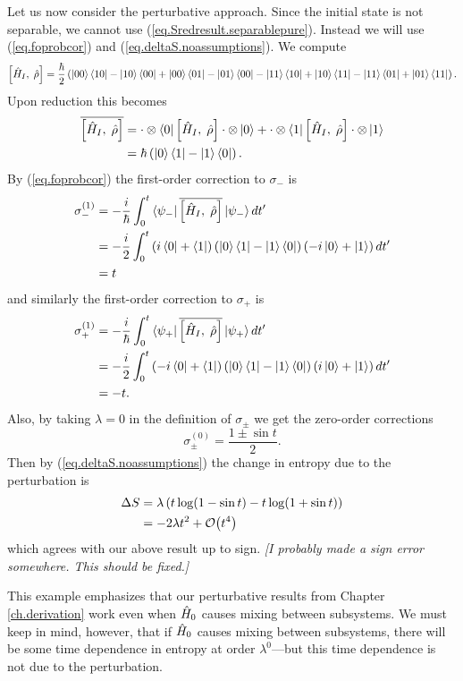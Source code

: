Let us now consider the perturbative approach. Since the initial state is not separable, we cannot use (\ref{eq.Sredresult.separablepure}). Instead we will use (\ref{eq.foprobcor}) and (\ref{eq.deltaS.noassumptions}). We compute
\[
\left[\hat{H}_I, \;\hat{\rho}\right] = \frac{\hbar}{2} \left(\left|00\right\rangle\left\langle10\right|- \left|10\right\rangle\left\langle00\right| + \left|00\right\rangle\left\langle01\right| - \left|01\right\rangle\left\langle00\right| - \left|11\right\rangle\left\langle10\right| + \left|10\right\rangle\left\langle11\right| - \left|11\right\rangle\left\langle01\right| +\left|01\right\rangle\left\langle11\right|\right).
\]
Upon reduction this becomes
\begin{align*}
\overline{\left[\hat{H}_I, \;\hat{\rho}\right]} &= \cdot\otimes\left\langle0\right| \left[\hat{H}_I, \;\hat{\rho}\right] \cdot\otimes\left|0\right\rangle + \cdot\otimes\left\langle1\right| \left[\hat{H}_I, \;\hat{\rho}\right] \cdot\otimes\left|1\right\rangle \\
&= \hbar\left(\left|0\right\rangle\left\langle1\right| - \left|1\right\rangle\left\langle0\right|\right).
\end{align*}
By (\ref{eq.foprobcor}) the first-order correction to \(\sigma_-\) is
\begin{align*}
\sigma_-^{(1)} &= -\frac{i}{\hbar} \int_{0}^t \left\langle\psi_-\right| \overline{\left[\hat{H}_I, \;\hat{\rho}\right]} \left|\psi_-\right\rangle dt^\prime \\
&= -\frac{i}{2} \int_{0}^t \left(i\left\langle0\right| + \left\langle1\right|\right) \left(\left|0\right\rangle\left\langle1\right| - \left|1\right\rangle\left\langle0\right|\right) \left(-i\left|0\right\rangle + \left|1\right\rangle\right) dt^\prime \\
&= t
\end{align*}
and similarly the first-order correction to \(\sigma_+\) is
\begin{align*}
\sigma_+^{(1)} &= -\frac{i}{\hbar} \int_{0}^t \left\langle\psi_+\right| \overline{\left[\hat{H}_I, \;\hat{\rho}\right]} \left|\psi_+\right\rangle dt^\prime \\
&= -\frac{i}{2} \int_{0}^t \left(-i\left\langle0\right| + \left\langle1\right|\right) \left(\left|0\right\rangle\left\langle1\right| - \left|1\right\rangle\left\langle0\right|\right) \left(i\left|0\right\rangle + \left|1\right\rangle\right) dt^\prime \\
&= -t.
\end{align*}
Also, by taking \(\lambda=0\) in the definition of \(\sigma_\pm\) we get the zero-order corrections
\[
\sigma_\pm^{(0)} = \frac{1\pm \sin t}{2}.
\]
Then by (\ref{eq.deltaS.noassumptions}) the change in entropy due to the perturbation is
\begin{align*}
\Delta S &= \lambda \left(t \log (1 - \sin t) - t\log(1+\sin t)\right) \\
&= -2\lambda t^2 + \mathcal{O}{\left(t^4\right)}
\end{align*}
which agrees with our above result up to sign. \emph{[I probably made a sign error somewhere. This should be fixed.]}

This example emphasizes that our perturbative results from Chapter \ref{ch.derivation} work even when \(\hat{H}_0\) causes mixing between subsystems. We must keep in mind, however, that if \(\hat{H}_0\) causes mixing between subsystems, there will be some time dependence in entropy at order \(\lambda^0\)---but this time dependence is not due to the perturbation.

